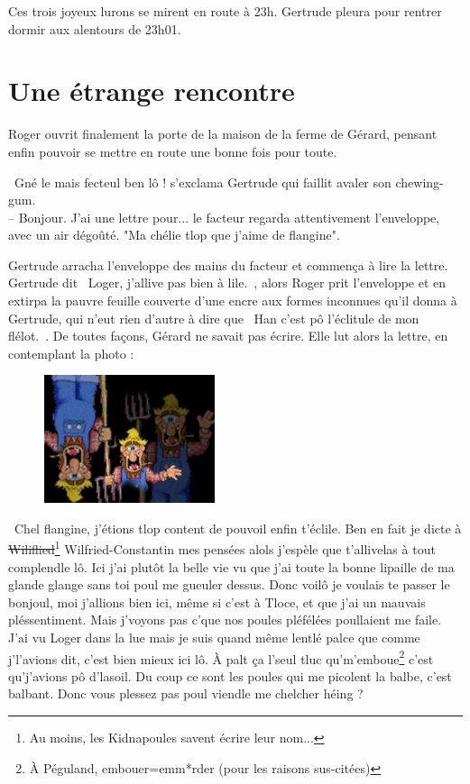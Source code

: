 \documentclass[a5paper, 10pt, twoside]{book}
\newcommand{\cg}{\guillemotleft~}
\newcommand{\cd}{~\guillemotright}
\begin{document}
Ces trois joyeux lurons se mirent en route à 23h. Gertrude pleura pour rentrer dormir aux alentours de 23h01.

\chapter{Une étrange rencontre}
Roger ouvrit finalement la porte de la maison de la ferme de Gérard, pensant enfin pouvoir se mettre en route une bonne fois pour toute.

\cg Gné le mais fecteul ben lô ! s'exclama Gertrude qui faillit avaler son chewing-gum.\\
-- Bonjour. J'ai une lettre pour... le facteur regarda attentivement l'enveloppe, avec un air dégoûté. "Ma chélie tlop que j'aime de flangine".\cd

Gertrude arracha l'enveloppe des mains du facteur et commença à lire la lettre. Gertrude dit \cg Loger, j'allive pas bien à lile.\cd, alors Roger prit l'enveloppe et en extirpa la pauvre feuille couverte d'une encre aux formes inconnues qu'il donna à Gertrude, qui n'eut rien d'autre à dire que \cg Han c'est pô l'éclitule de mon flélot.\cd. De toutes façons, Gérard ne savait pas écrire. Elle lut alors la lettre, en contemplant la photo :

\begin{figure}
\includegraphics[width=5cm]{imgs/GerardNoir.png}
\end{figure}
\cg Chel flangine, j'étions tlop content de pouvoil enfin t'éclile. Ben en fait je dicte à \sout{Wiliflied}\footnote{Au moins, les Kidnapoules savent écrire leur nom...} Wilfried-Constantin mes pensées alols j'espèle que t'allivelas à tout complendle lô. Ici j'ai plutôt la belle vie vu que j'ai toute la bonne lipaille de ma glande glange sans toi poul me gueuler dessus. Donc voilô je voulais te passer le bonjoul, moi j'allions bien ici, même si c'est à Tloce, et que j'ai un mauvais pléssentiment. Mais j'voyons pas c'que nos poules pléfélées poullaient me faile. J'ai vu Loger dans la lue mais je suis quand même lentlé palce que comme j'l'avions dit, c'est bien mieux ici lô. À palt ça l'seul tluc qu'm'emboue\footnote{À Péguland, embouer=emm*rder (pour les raisons sus-citées)} c'est qu'j'avions pô d'lasoil. Du coup ce sont les poules qui me picolent la balbe, c'est balbant. Donc vous plessez pas poul viendle me chelcher héing ?\cd
\end{document}
